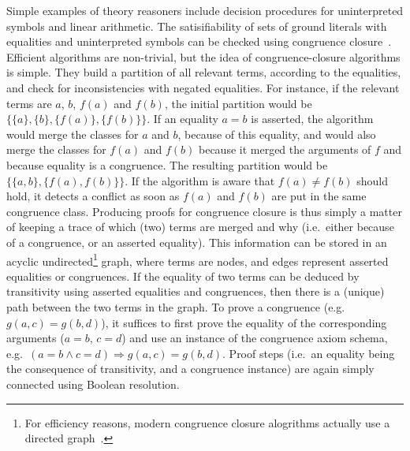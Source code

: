 \documentclass{llncs}
\begin{document}
Simple examples of theory reasoners include decision procedures for
uninterpreted symbols and linear arithmetic.
The satisifiability of sets of ground literals with equalities and uninterpreted
symbols can be checked using congruence
closure~\cite{Nelson2,Nieuwenhuis3,Nieuwenhuis6}.  Efficient algorithms are
non-trivial, but the idea of congruence-closure algorithms is simple.  They
build a 
partition of all relevant terms, according to the equalities, and check for
inconsistencies with negated equalities.  For instance, if the relevant terms
are $a$, $b$, $f(a)$ and $f(b)$, the initial partition would be $\big\{\{a\},
\{b\}, \{f(a)\}, \{f(b)\}\big\}$.  If an equality $a=b$ is asserted, the
algorithm would merge the classes for $a$ and $b$, because of this equality, and
would also merge the classes for $f(a)$ and $f(b)$ because it merged the
arguments of $f$ and because equality is a congruence.  The resulting partition would be $\big\{\{a, b\}, \{f(a), f(b)\}\big\}$.  If the algorithm is
aware that $f(a) \neq f(b)$ should hold, it detects a conflict as soon as $f(a)$
and $f(b)$ are put in the same congruence class.  Producing proofs for congruence
closure is thus simply a matter of keeping a trace of which (two) terms are merged
and why (i.e.\ either because of a congruence, or an asserted equality).  This
information can be stored in an acyclic undirected\footnote{For efficiency
  reasons, modern congruence closure alogrithms actually use a directed
  graph~\cite{Nieuwenhuis6}.} graph, where terms are nodes, and edges represent
asserted equalities or congruences.  If the equality of two terms can be deduced
by transitivity using asserted equalities and congruences, then there is a
(unique) path between the two terms in the graph.  To prove a congruence
(e.g.\ $g(a,c) = g(b,d)$), it suffices to first prove the equality of the
corresponding arguments ($a=b$, $c=d$) and use an instance of the congruence
axiom schema, e.g.\ $(a=b \wedge c=d) \Rightarrow g(a,c) = g(b,d)$.  Proof
steps (i.e.\ an equality being the consequence of transitivity, and a congruence
instance) are again simply connected using Boolean resolution.
\end{document}

